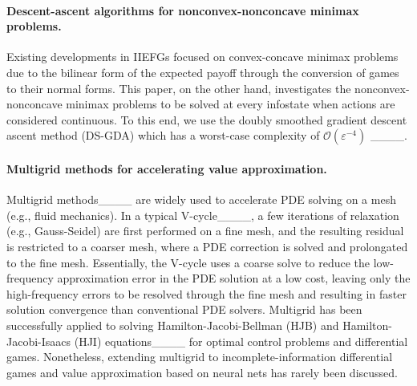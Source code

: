 \paragraph{Descent-ascent algorithms for nonconvex-nonconcave minimax problems.} Existing developments in IIEFGs focused on convex-concave minimax problems due to the bilinear form of the expected payoff through the conversion of games to their normal forms. This paper, on the other hand, investigates the nonconvex-nonconcave minimax problems to be solved at every infostate when actions are considered continuous. 
To this end, we use the doubly smoothed gradient descent ascent method (DS-GDA) which has a worst-case complexity of $\mathcal{O}(\varepsilon^{-4})$
____.
\vspace{-0.3in}
\paragraph{Multigrid methods for accelerating value approximation.} 
Multigrid methods____ are widely used to accelerate PDE solving on a mesh (e.g., fluid mechanics). In a typical V-cycle____, a few iterations of relaxation (e.g., Gauss-Seidel) are first performed on a fine mesh, and the resulting residual is restricted to a coarser mesh, where a PDE correction is solved and prolongated to the fine mesh. Essentially, the V-cycle uses a coarse solve to reduce the low-frequency approximation error in the PDE solution at a low cost, leaving only the high-frequency errors to be resolved through the fine mesh and resulting in faster solution convergence than conventional PDE solvers. 
Multigrid has been successfully applied to solving Hamilton-Jacobi-Bellman (HJB) and Hamilton-Jacobi-Isaacs (HJI) equations____ for optimal control problems and differential games. 
Nonetheless, extending multigrid to incomplete-information differential games and value approximation based on neural nets has rarely been discussed. 

%